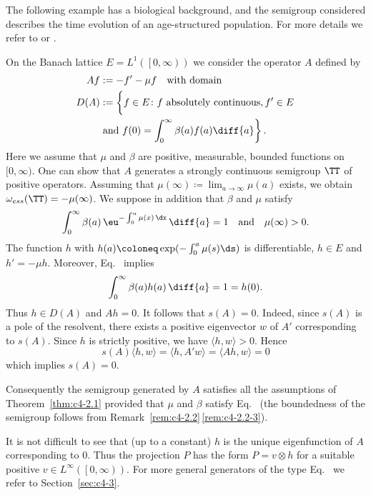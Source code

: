 The following example has a biological background, and the semigroup considered describes the time evolution of an age-structured population.
For more details we refer to \textcite{greiner:1984a} or \textcite{webb:1984}.
\begin{example}\label{ex:c4-2.3}
On the Banach lattice $E = L^{1}( \left[0,\infty\right))$ we consider the operator $A$ defined by
\begin{equation}\label{eq:c4-2.2}
\begin{split}
	Af &:= -f' - \mu f \quad \text{with domain}\\ 
	D(A) &:= \left\{ \vphantom{\int_{0}^{\infty}}f \in E \colon f \text{ absolutely continuous}, f' \in E  \right. \\
	 \qquad & \left. \text{and } f(0) = \int_{0}^{\infty} \beta(a) f(a)  \diff{a} \vphantom{\}} \right\}.
\end{split}
\end{equation}
Here we assume that $\mu$ and $\beta$ are positive, measurable, bounded functions on $[0,\infty)$.
One can show that $A$ generates a strongly continuous semigroup $\TT$ of positive operators.
Assuming that $\mu(\infty) \coloneq \lim_{a \to \infty}\mu(a)$ exists, we obtain $\omega_{ess}(\TT) = -\mu(\infty)$.
We suppose in addition that $\beta$ and $\mu$ satisfy
\begin{equation}\label{eq:c4-2.3}
\int_{0}^{\infty} \beta(a)\,\eu^{-\int_{0}^{a} \mu(x)\,\dx}\,\diff{a} = 1
\quad \text{and} \quad \mu(\infty) > 0.
\end{equation}
The function $h$ with $h(a) \coloneq \exp(-\int_{0}^{a} \mu(s) \ds)$ is differentiable, $h \in E$ and $h' = -\mu h$.
Moreover, Eq.~ implies 
%
\[
	 \int_{0}^{\infty} \beta(a)h(a) \, \diff{a} = 1 = h(0) .
\]
%
Thus $h \in D(A)$ and $Ah = 0$.
It follows that $s(A) = 0$.
Indeed, since $s(A)$ is a pole of the resolvent, there exists a positive eigenvector $w$ of\/ $A'$ corresponding to $s(A)$.
Since $h$ is strictly positive, we have $\langle h,w \rangle > 0$. 
Hence 
\[
s(A)\langle h,w \rangle = \langle h,A'w \rangle = \langle Ah,w \rangle = 0
\]
which implies $s(A) = 0$.

Consequently the semigroup generated by $A$ satisfies all the assumptions of Theorem~\ref{thm:c4-2.1} provided that $\mu$ and $\beta$ satisfy Eq.~ (the boundedness of the semigroup follows from Remark~\ref{rem:c4-2.2}\,\ref{rem:c4-2.2-3}).

It is not difficult to see that (up to a constant) $h$ is the unique eigenfunction of\/ $A$ corresponding to $0$.
Thus the projection $P$ has the form $P = v \otimes h$ for a suitable positive $v \in L^{\infty}(\left[0,\infty\right))$.
For more general generators of the type Eq.~ we refer to Section~\ref{sec:c4-3}.
\end{example}
